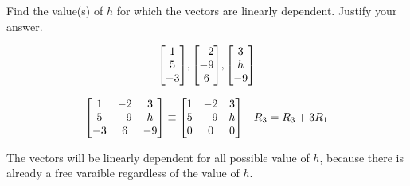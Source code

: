 \documentclass{../mathhomework}
\newenvironment{Mat}{\begin{bmatrix}}{\end{bmatrix}}
\begin{document}
\newpage

\begin{problem}[1.7\#13]
    Find the value(s) of $h$ for which the vectors are linearly dependent. Justify your answer.

    \begin{equation*}
        \begin{Mat}
            1 \\ 5 \\ -3
        \end{Mat},
        \begin{Mat}
            -2 \\ -9 \\ 6
        \end{Mat},
        \begin{Mat}
            3 \\ h \\ -9
        \end{Mat}
    \end{equation*}

    \begin{solution}
        \begin{align*}
            \begin{Mat}
                1 & -2 & 3 \\ 
                5 & -9 & h \\ 
                -3 & 6 & -9
            \end{Mat} & \equiv
            \begin{Mat}
                1 & -2 & 3 \\ 
                5 & -9 & h \\ 
                0 & 0 & 0
            \end{Mat} & R_3 = R_3 + 3R_1
        \end{align*}

        The vectors will be linearly dependent for all possible value of $h$, because there is already a free varaible regardless of the value of $h$.
    \end{solution}
\end{problem}
\end{document}
